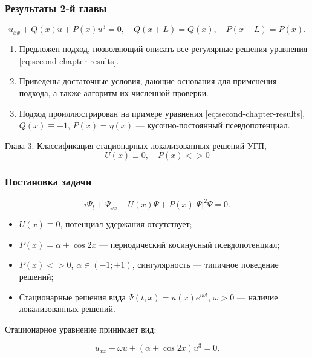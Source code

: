 \documentclass [10pt] {beamer}
\begin{document}
\begin{frame}
	\frametitle{Результаты 2-й главы}
	
	\begin{equation}
		u_{xx} + Q(x) u + P(x) u^3 = 0, \quad Q(x + L) = Q(x), \quad P(x + L) = P(x).
		\label{eq:second-chapter-results}
	\end{equation}
	
	\begin{enumerate}
		\item Предложен подход, позволяющий описать все регулярные решения уравнения \eqref{eq:second-chapter-results}.
		\item Приведены достаточные условия, дающие основания для применения подхода, а также алгоритм их численной проверки.
		\item Подход проиллюстрирован на примере уравнения \eqref{eq:second-chapter-results}, $Q(x) \equiv - 1$, $P(x) = \eta(x)$ --- кусочно-постоянный псевдопотенциал.
	\end{enumerate}
\end{frame}

\begin{frame}
	\begin{center}
		{\LARGE Глава 3. Классификация стационарных локализованных решений УГП, $$U(x) \equiv 0, \quad P(x) <> 0$$}
	\end{center}
\end{frame}

\begin{frame}
	\frametitle{Постановка задачи}
	
	\begin{equation}
		i \Psi_t + \Psi_{xx} - U(x) \Psi + P(x) |\Psi|^2 \Psi = 0.
	\label{eq:gpe-cosine}
	\end{equation}
	
	\begin{itemize}
		\item $U(x) \equiv 0$, потенциал удержания отсутствует;
		\item $P(x) = \alpha + \cos 2x$ --- периодический косинусный псевдопотенциал;
		\item $P(x) <> 0$, $\alpha \in (-1; +1)$, сингулярность --- типичное поведение решений;
		\item Стационарные решения вида $\Psi(t, x) = u(x) e^{i \omega t}$, $\omega > 0$ --- наличие локализованных решений.
	\end{itemize}
	
	\vspace{15pt}
	
	Стационарное уравнение принимает вид:
	
	\begin{equation}
		u_{xx} - \omega u + (\alpha + \cos 2x) u^3 = 0.
		\label{eq:stationary-cosine}
	\end{equation}
\end{frame}
\end{document}
